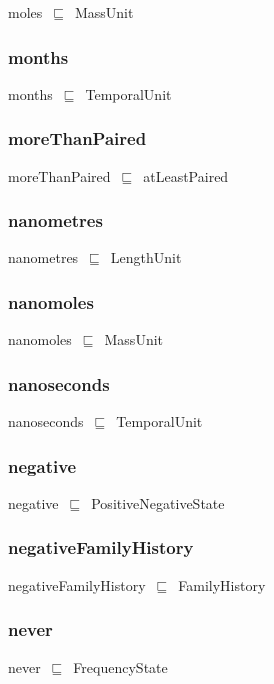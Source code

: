 \documentclass{article}
\begin{document}
moles~\ensuremath{\sqsubseteq}~MassUnit~

\subsubsection*{months}

months~\ensuremath{\sqsubseteq}~TemporalUnit~

\subsubsection*{moreThanPaired}

moreThanPaired~\ensuremath{\sqsubseteq}~atLeastPaired~

\subsubsection*{nanometres}

nanometres~\ensuremath{\sqsubseteq}~LengthUnit~

\subsubsection*{nanomoles}

nanomoles~\ensuremath{\sqsubseteq}~MassUnit~

\subsubsection*{nanoseconds}

nanoseconds~\ensuremath{\sqsubseteq}~TemporalUnit~

\subsubsection*{negative}

negative~\ensuremath{\sqsubseteq}~PositiveNegativeState~

\subsubsection*{negativeFamilyHistory}

negativeFamilyHistory~\ensuremath{\sqsubseteq}~FamilyHistory~

\subsubsection*{never}

never~\ensuremath{\sqsubseteq}~FrequencyState~
\end{document}

